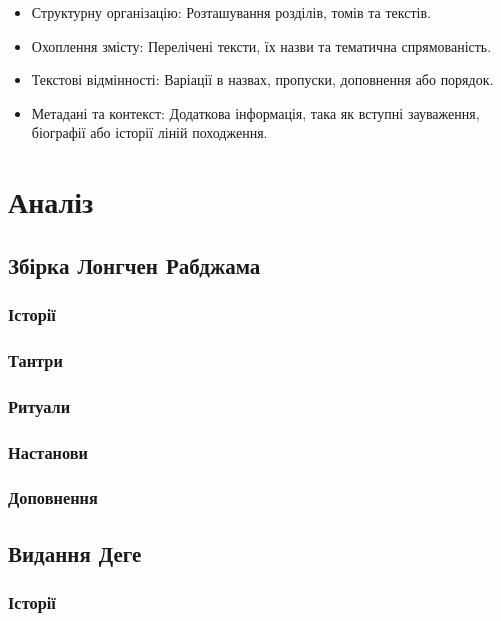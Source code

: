 \documentclass{article}
\begin{document}
\begin{itemize}
\item Структурну організацію: Розташування розділів, томів та текстів.
\item Охоплення змісту: Перелічені тексти, їх назви та тематична спрямованість.
\item Текстові відмінності: Варіації в назвах, пропуски, доповнення або порядок.
\item Метадані та контекст: Додаткова інформація, така як вступні зауваження, біографії або історії ліній походження.
\end{itemize}

\section{Аналіз}

\subsection{Збірка Лонгчен Рабджама}

\subsubsection{Історії}
\subsubsection{Тантри}
\subsubsection{Ритуали}
\subsubsection{Настанови}
\subsubsection{Доповнення}

\subsection{Видання Деге}

\subsubsection{Історії}
\end{document}
